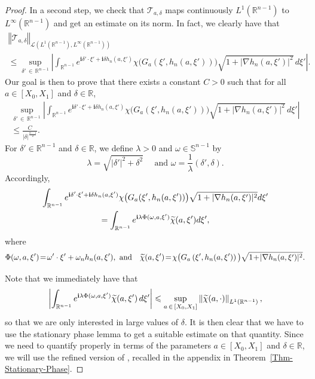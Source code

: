 \documentclass[AHL,Unicode,longabstracts]{cedram}
\newcommand{\scL}{\mathscr{L}}
\newcommand{\scT}{\mathscr{T}}
\newcommand*\R{\mathbb{R}}
\renewcommand*\S{\mathbb{S}}
\renewcommand{\i}{\mathbf{i}}
\newcommand{\norm}[1]{\left\Vert#1\right\Vert}
\renewcommand{\leq}{\leqslant}
\renewcommand{\tilde}{\widetilde}
\let\oldtilde\tilde
\renewcommand*{\tilde}[1]{\mathchoice{\widetilde{#1}}{\widetilde{#1}}{\oldtilde{#1}}{\oldtilde{#1}}}
\begin{document}
\begin{proof}
In a second step, we check that $\scT_{a, \delta}$ maps continuously $L^1(\R^{n-1})$ to $L^\infty(\R^{n-1})$ and get an estimate on its norm. In fact, we clearly have that
\begin{multline}\label{Est-T-a-delta-L1-Linfini}
\norm{
\scT_{a,\delta} }_{\scL\left(L^{1}\left(\R^{n-1}\right), L^\infty\left(\R^{n-1}\right)\right)} \\
\leq
\sup_{\delta'\, \in\,\R^{n-1}}
\left| \int_{\R^{n-1}} e^{\i \delta' \cdot \xi' + \i \delta h_n(a, \xi')} \chi\big(G_a(\xi', h_n(a,\xi'))\big) \sqrt{1 + |\nabla h_n(a,\xi')|^2} \, d \xi' \right|.
\end{multline}
Our goal is then to prove that there exists a constant $C>0$ such that for all $a \in [X_0, X_1]$ and $\delta \in \R$,
\begin{multline}\label{Stationary-Phase-Goal}
\sup_{\delta'\, \in\,\R^{n-1}}
\left|
\int_{\R^{n-1}} e^{\i \delta' \cdot \xi' + \i \delta h_n(a, \xi')} \chi\big(G_a(\xi', h_n(a,\xi'))\big) \sqrt{1 + \left|\nabla h_n(a,\xi')\right|^2} \, d \xi'
\right|\\
\leq
\frac{C}{|\delta|^{\frac{n-1}{2}}}.
\end{multline}
For $\delta' \in \R^{n-1}$ and $\delta \in \R$, we define $\lambda >0$ and $\omega \in \S^{n-1}$ by
\[
\lambda = \sqrt{|\delta'|^2 + \delta^2}
\quad
\text{ and }
\omega = \frac{1}{\lambda}(\delta', \delta).
\]
Accordingly,
\begin{multline*}
\int_{\R^{n-1}} e^{\i \delta' \cdot \xi' + \i \delta h_n(a, \xi')} \chi\big(G_a(\xi', h_n(a,\xi'))\big) \sqrt{1 + |\nabla h_n(a,\xi')|^2} d \xi'\\
= 
\int_{\R^{n-1}}  e^{\i \lambda \Phi(\omega, a, \xi')} \tilde \chi(a,\xi') d \xi',
\end{multline*}
where
\begin{equation*}
\Phi(\omega, a, \xi')\! = \!\omega' \cdot \xi' + \omega_n h_n(a, \xi'),
\text{ and} 
\quad
\tilde \chi(a,\xi')\! =\! \chi\big(G_a\left(\xi', h_n(a,\xi')\right)\big) \sqrt{1 \!+\! |\nabla h_n(a,\xi')|^2}.
\end{equation*}


Note that we immediately have that
\begin{equation}\label{Stationary-Phase-Goal-0}
\left| \int_{\R^{n-1}} e^{\i \lambda \Phi(\omega, a, \xi')} \tilde \chi(a,\xi') \, d \xi'\right|
\leq \sup_{a\, \in\,[X_0,X_1]} \left\|\tilde \chi(a, \cdot) \right\|_{L^1\left(\R^{n-1}\right)},
\end{equation}
so that we are only interested in large values of $\delta$. It is then clear that we have to use the stationary phase lemma to get a suitable estimate on that quantity. Since we need to quantify properly in terms of the parameters $a \in [X_0,X_1]$ and $\delta \in \R$, we will use the refined version of {\cite[Theorem~1]{alazard2017stationary}}, recalled in the appendix in Theorem~\ref{Thm-Stationary-Phase}.




\end{proof}
\end{document}
